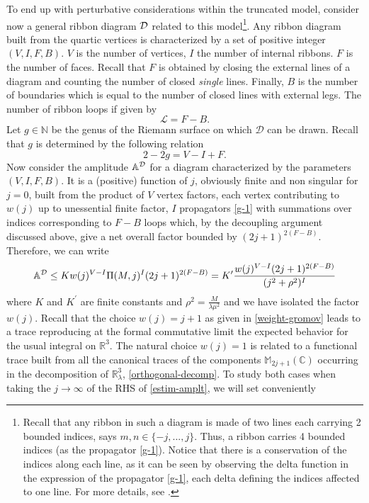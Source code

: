 \documentclass[11pt]{book}
\theoremstyle{break}
\begin{document}
To end up with perturbative considerations within the truncated model, consider now a general ribbon diagram ${\cal{D}}$ related to this model{\footnote{Recall that any ribbon in such a diagram is made of two lines each carrying 2 bounded indices, says $m,n\in\{-j,...,j \}$. Thus, a ribbon carries 4 bounded indices (as the propagator \eqref{g-1}). Notice that there is a conservation of the indices along each line, as it can be seen by observing the delta function in the expression of the propagator \eqref{g-1}, each delta defining the indices affected to one line. For more details, see \cite{vit-wal-12}.}}. Any ribbon diagram built from the quartic vertices is characterized by a set of positive integer $(V,I,F,B)$. $V$ is the number of vertices, $I$ the number of internal ribbons. $F$ is the number of faces. Recall that $F$ is obtained by closing the external lines of a diagram and counting the number of closed {\it{single}} lines. Finally, $B$ is the number of boundaries which is equal to the number of closed lines with external legs. The number of ribbon loops if given by
\begin{equation}
\mathcal{L}=F-B \label{loops-number}.
\end{equation}
Let $g\in\mathbb{N}$ be the genus of the Riemann surface on which $\mathcal{D}$ can be drawn. Recall that $g$ is determined by the following relation
\begin{equation}
2-2g=V-I+F \label{euler}.
\end{equation}
Now consider the amplitude ${\mathbb{A}}^{\cal{D}}$ for a diagram characterized by the parameters $(V,I,F,B)$. It is a (positive) function of $j$, obviously finite and non singular for $j=0$, built from the product of $V$ vertex factors, each vertex contributing to $w(j)$ up to unessential finite factor, $I$ propagators \eqref{g-1} with summations over indices corresponding to $F-B$ loops which, by the decoupling argument discussed above, give a net overall factor bounded by $(2j+1)^{2(F-B)}$. Therefore, we can write
\begin{equation}
{\mathbb{A}}^{\cal{D}}\le Kw(j)^{V-I}\Pi(M,j)^{I}(2j+1)^{2(F-B)}=K^\prime\frac{w(j)^{V-I}(2j+1)^{2(F-B)}}{(j^2+\rho^2)^I}\label{estim-amplt}
\end{equation}
where $K$ and $K^\prime$ are finite constants and $\rho^2=\frac{M}{\lambda\mu^2}$ and we have isolated the factor $w(j)$. Recall that the choice $w(j)=j+1$ as given in \eqref{weight-gromov} leads to a trace reproducing at the formal commutative limit the expected behavior for the usual integral on $\mathbb{R}^3$. The natural choice $w(j)=1$ is related to a functional trace built from all the canonical traces of the components $\mathbb{M}_{2j+1}(\mathbb{C})$ occurring in the decomposition of $\mathbb{R}^3_\lambda$, \eqref{orthogonal-decomp}. To study both cases when taking the $j\to\infty$ of the RHS of \eqref{estim-amplt}, we will set conveniently
\end{document}
